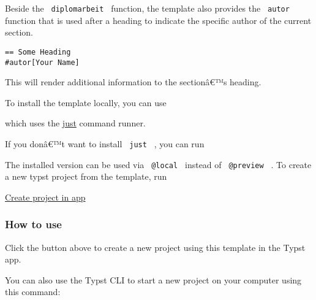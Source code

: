 Beside the \texttt{\ diplomarbeit\ } function, the template also
provides the \texttt{\ autor\ } function that is used after a heading to
indicate the specific author of the current section.

\begin{verbatim}
== Some Heading
#autor[Your Name]
\end{verbatim}

This will render additional information to the sectionâ€™s heading.

To install the template locally, you can use

\begin{Shaded}
\begin{Highlighting}[]
\end{Highlighting}
\end{Shaded}

which uses the \href{https://github.com/casey/just}{just} command
runner.

If you donâ€™t want to install \texttt{\ just\ } , you can run

\begin{Shaded}
\begin{Highlighting}[]
\end{Highlighting}
\end{Shaded}

The installed version can be used via \texttt{\ @local\ } instead of
\texttt{\ @preview\ } . To create a new typst project from the template,
run

\begin{Shaded}
\begin{Highlighting}[]
\end{Highlighting}
\end{Shaded}

\href{/app?template=htlwienwest-da&version=0.1.0}{Create project in app}

\subsubsection{How to use}\label{how-to-use}

Click the button above to create a new project using this template in
the Typst app.

You can also use the Typst CLI to start a new project on your computer
using this command:

